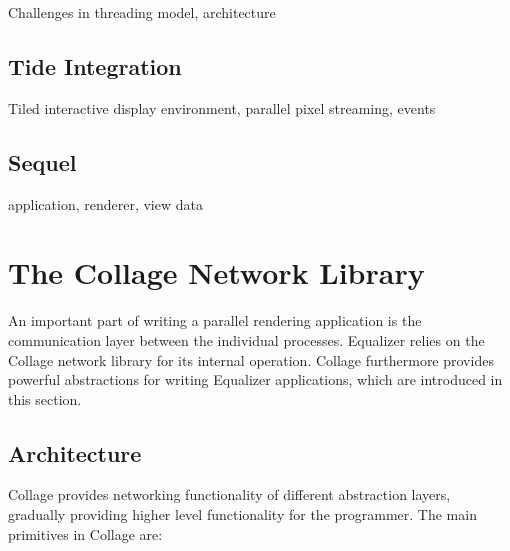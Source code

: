 \documentclass[10pt,journal,compsoc]{IEEEtran}
\begin{document}
Challenges in threading model, architecture

\subsection{Tide Integration}

Tiled interactive display environment, parallel pixel streaming, events

\subsection{Sequel}\label{sec:sequel}

application, renderer, view data

\section{The Collage Network Library}

An important part of writing a parallel rendering application is the
communication layer between the individual processes. Equalizer relies on the
Collage network library for its internal operation. Collage furthermore provides
powerful abstractions for writing Equalizer applications, which are introduced
in this section.

\subsection{Architecture}

Collage provides networking functionality of different abstraction layers,
gradually providing higher level functionality for the programmer. The main
primitives in Collage are:
\end{document}
